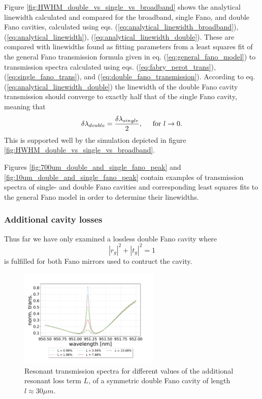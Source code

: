 Figure \ref{fig:HWHM_double_vs_single_vs_broadband} shows the analytical linewidth calculated and compared for the broadband, single Fano, and double Fano cavities, calculated using eqs. (\ref{eq:analytical_linewidth_broadband}), (\ref{eq:analytical_linewidth}), (\ref{eq:analytical_linewidth_double}). These are compared with linewidths found as fitting parameters from a least squares fit of the general Fano transmission formula given in eq. (\ref{eq:general_fano_model}) to transmission spectra calculated using eqs. (\ref{eq:fabry_perot_trans}), (\ref{eq:single_fano_trans}), and (\ref{eq:double_fano_transmission}). According to eq. (\ref{eq:analytical_linewidth_double}) the linewidth of the double Fano cavity transmission should converge to exactly half that of the single Fano cavity, meaning that
\begin{equation}
    \delta \lambda_{double} = \frac{\delta \lambda_{single}}{2}, \hspace{0.5cm} \text{for } l \rightarrow 0.
\end{equation}
This is supported well by the simulation depicted in figure \ref{fig:HWHM_double_vs_single_vs_broadband}.

Figures \ref{fig:700um_double_and_single_fano_peak} and \ref{fig:10um_double_and_single_fano_peak} contain examples of transmission spectra of single- and double Fano cavities and corresponding least squares fits to the general Fano model in order to determine their linewidths. 

\subsubsection{Additional cavity losses}\label{sec:additional_losses_theory}

Thus far we have only examined a lossless double Fano cavity where
\begin{equation}
    |r_g|^2 + |t_g|^2 = 1
\end{equation}
is fulfilled for both Fano mirrors used to contruct the cavity.

\begin{figure}[h!]
    \centering
    \includegraphics[width=0.6\textwidth]{figures/double_fano_loss_scan.pdf}
    \caption{Resonant transmission spectra for different values of the additional resonant loss term $L$, of a symmetric double Fano cavity of length $l \approx 30 \mu m$.}
    \label{fig:double_loss_scan}
\end{figure}

